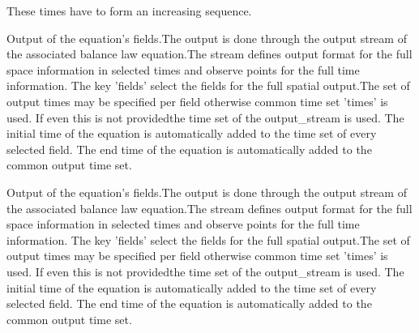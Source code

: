 \begin{RecordType}{}{}{}{}
{{{These times have to form an increasing sequence.}}}\end{RecordType}\begin{RecordType}{}{}{}{}{}\end{RecordType}\begin{RecordType}{}{}{}{}{{{Output of the equation's fields.The output is done through the output stream of the associated balance law equation.The stream defines output format for the full space information in selected times and observe points for the full time information. The key 'fields' select the fields for the full spatial output.The set of output times may be specified  per field otherwise common time set 'times' is used. If even this is not providedthe time set of the output{\_}stream is used. The initial time of the equation is automatically added to the time set of every selected field. The end time of the equation is automatically added to the common output time set.}}}\end{RecordType}\begin{RecordType}{}{}{}{}{{{Output of the equation's fields.The output is done through the output stream of the associated balance law equation.The stream defines output format for the full space information in selected times and observe points for the full time information. The key 'fields' select the fields for the full spatial output.The set of output times may be specified  per field otherwise common time set 'times' is used. If even this is not providedthe time set of the output{\_}stream is used. The initial time of the equation is automatically added to the time set of every selected field. The end time of the equation is automatically added to the common output time set.}}}
\end{RecordType}
